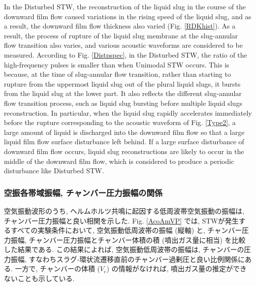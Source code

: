 \documentclass[12pt]{article}
\begin{document}
In the Disturbed STW, the reconstruction of the liquid slug in the course of the downward film flow caused variations in the rising speed of the liquid slug, and as a result, the downward film flow thickness also varied (Fig. \ref{RDKhist}).
As a result, the process of rupture of the liquid slug membrane at the slug-annular flow transition also varies, and various acoustic waveforms are considered to be measured.
According to Fig. \ref{Distpspec}, in the Disturbed STW, the ratio of the high-frequency pulses is smaller than when Unimodal STW occurs.
This is because, at the time of slug-annular flow transition, rather than starting to rupture from the uppermost liquid slug out of the plural liquid slugs, it bursts from the liquid slug at the lower part.
It also reflects the different slug-annular flow transition process, such as liquid slug bursting before multiple liquid slugs reconstruction.
In particular, when the liquid slug rapidly accelerates immediately before the rupture corresponding to the acoustic waveform of Fig. \ref{Type2}, a large amount of liquid is discharged into the downward film flow so that a large liquid film flow surface disturbance left behind.
If a large surface disturbance of downward film flow occurs, liquid slug reconstructions are likely to occur in the middle of the downward film flow, which is considered to produce a periodic disturbance like Disturbed STW.






\subsubsection{空振各帯域振幅, チャンバー圧力振幅の関係}


空気振動波形のうち, ヘルムホルツ共鳴に起因する低周波帯空気振動の振幅は, チャンバー圧力振幅と良い相関を示した. 
Fig. \ref{AcoAmVP} では, STWが発生するすべての実験条件において, 空気振動低周波帯の振幅 (縦軸) と, チャンバー圧力振幅, チャンバー圧力振幅とチャンバー体積の積 (噴出ガス量に相当) を比較した結果である. 
この結果によれば, 空気振動低周波帯の振幅は, チャンバーの圧力振幅, すなわちスラグ-環状流遷移直前のチャンバー過剰圧と良い比例関係にある. 
一方で, チャンバーの体積 ($V_\mathrm{c}$) の情報がなければ, 噴出ガス量の推定ができないことも示している. 
\end{document}
